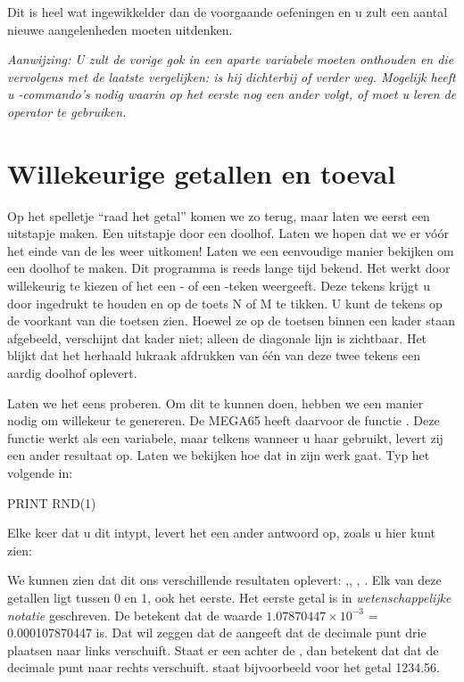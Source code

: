 Dit is heel wat ingewikkelder dan de voorgaande oefeningen en u zult een aantal nieuwe aangelenheden moeten uitdenken.

{\em Aanwijzing: U zult de vorige gok in een aparte variabele moeten onthouden en die vervolgens met de laatste vergelijken: is hij dichterbij of verder weg. Mogelijk heeft u -commando's nodig waarin op het eerste  nog een ander volgt, of moet u leren de operator  te gebruiken.}

\section{Willekeurige getallen en toeval}

Op het spelletje ``raad het getal'' komen we zo terug, maar laten we eerst een uitstapje maken. Een uitstapje door een doolhof. Laten we hopen dat we er vóór het einde van de les weer uitkomen! Laten we een eenvoudige manier bekijken om een doolhof te maken. Dit programma is reeds lange tijd bekend. Het werkt door willekeurig te kiezen of het een {}- of een {}-teken weergeeft. Deze tekens krijgt u door  ingedrukt te houden en op de toets N of M te tikken. U kunt de tekens op de voorkant van die toetsen zien. Hoewel ze op de toetsen binnen een kader staan afgebeeld, verschijnt dat kader niet; alleen de diagonale lijn is zichtbaar. Het blijkt dat het herhaald lukraak afdrukken van één van deze twee tekens een aardig doolhof oplevert.

\needspace{4cm}
Laten we het eens proberen. Om dit te kunnen doen, hebben we een manier nodig om willekeur te genereren. De MEGA65 heeft daarvoor de functie . Deze functie werkt als een variabele, maar telkens wanneer u haar gebruikt, levert zij een ander resultaat op. Laten we bekijken hoe dat in zijn werk gaat. Typ het volgende in:

\begin{screencode}
PRINT RND(1)
\end{screencode}

Elke keer dat u dit intypt, levert het een ander antwoord op, zoals u hier kunt zien:


We kunnen zien dat dit ons verschillende resultaten oplevert: ,, , . Elk van deze getallen ligt tussen 0 en 1, ook het eerste. Het eerste getal is in {\em wetenschappelijke notatie} geschreven. De  betekent dat de waarde $1.07870447\times10^{-3}$ = 0.000107870447 is. Dat wil zeggen dat de  aangeeft dat de decimale punt drie plaatsen naar links verschuift. Staat er een \stw{+} achter de , dan betekent dat dat de decimale punt naar rechts verschuift.  staat bijvoorbeeld voor het getal 1234.56.

